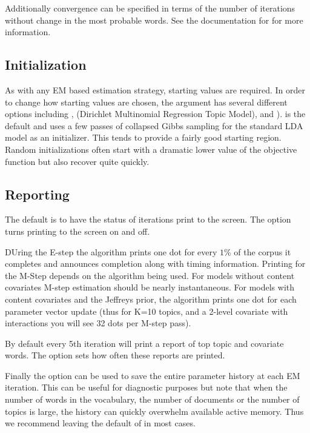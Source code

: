 \documentclass[nojss]{jss}
\begin{document}
Additionally convergence can be specified in terms of the number of iterations without change in the most probable words.  See the documentation for  for more information.

\subsection{Initialization}
As with any EM based estimation strategy, starting values are required. In order to change how starting values are chosen, the argument  has several different options including ,  (Dirichlet Multinomial Regression Topic Model), and ).
 is the default and uses a few passes of collapsed Gibbs sampling for the standard LDA model as an initializer.  This tends to provide a fairly good starting region.  Random initializations often start with a dramatic lower value of the objective function but also recover quite quickly.

\subsection{Reporting}
The default is to have the status of iterations print to the screen. The  option turns printing to the screen on and off.

DUring the E-step the algorithm prints one dot for every $1\%$ of the corpus it completes and announces completion along with timing information.  Printing for the M-Step depends on the algorithm being used.  For models without content covariates M-step estimation should be nearly instantaneous.  For models with content covariates and the Jeffreys prior, the algorithm prints one dot for each parameter vector update (thus for K=10 topics, and a 2-level covariate with interactions you will see 32 dots per M-step pass).  

By default every 5th iteration will print a report of top topic and covariate words.  The  option sets how often these reports are printed.

Finally the  option can be used to save the entire parameter history at each EM iteration.  This can be useful for diagnostic purposes but note that when the number of words in the vocabulary, the number of documents or the number of topics is large, the history can quickly overwhelm available active memory. Thus we recommend leaving the default of  in most cases.
\end{document}
